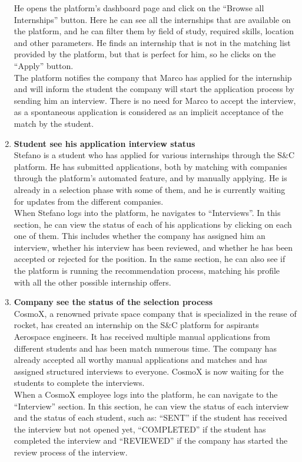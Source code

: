 \begin{enumerate}
        He opens the platform's dashboard page and click on the “Browse all Internships” button. Here he can see all the internships that are available on the platform, and he can filter them by field of study, required skills, location and other parameters.
        He finds an internship that is not in the matching list provided by the platform, but that is perfect for him, so he clicks on the “Apply” button.\\
        The platform notifies the company that Marco has applied for the internship and will inform the student the company will start the application process by sending him an interview. There is no need for Marco to accept the interview, as a spontaneous application is considered as an implicit acceptance of the match by the student.
    \item \textbf{\textcolor{titleColor}{Student see his application  interview status}}\\
        Stefano is a student who has applied for various internships through the S\&C platform. He has submitted applications, both by matching with companies through the platform's automated feature, and by manually applying. He is already in a selection phase with some of them, and he is currently waiting for updates from the different companies.\\
        When Stefano logs into the platform, he navigates to “Interviews”. In this section, he can view the status of each of his applications by clicking on each one of them. This includes whether the company has assigned him an interview, whether his interview has been reviewed, and whether he has been accepted or rejected for the position. In the same section, he can also see if the platform is running the recommendation process, matching his profile with all the other possible internship offers.
    \item \textbf{\textcolor{titleColor}{Company see the status of the selection process}}\\
        CosmoX, a renowned private space company that is specialized in the reuse of rocket, has created an internship on the S\&C platform for aspirants Aerospace engineers. It has received multiple manual applications from different students and has been match numerous time. The company has already accepted all worthy manual applications and matches and has assigned structured interviews to everyone. CosmoX is now waiting for the students to complete the interviews.\\
        When a CosmoX employee logs into the platform, he can navigate to the “Interview” section. In this section, he can view the status of each interview and the status of each student, such as: “SENT” if the student has received the interview but not opened yet, “COMPLETED” if the student has completed the interview and “REVIEWED” if the company has started the review process of the interview.

\end{enumerate}
